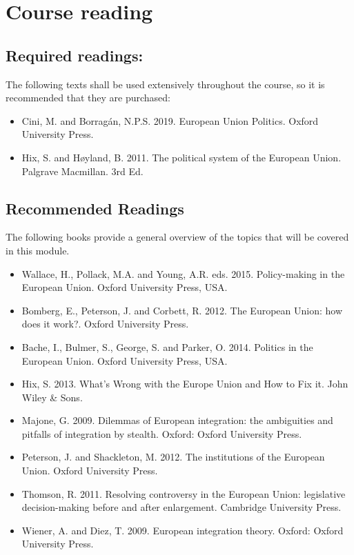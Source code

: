 
\section*{Course reading}

\subsection*{Required readings:}

The following texts shall be used extensively throughout the course, so it is recommended that they are purchased:

\begin{itemize}
	\item Cini, M. and Borragán, N.P.S. 2019. European Union Politics. Oxford University Press.
	\item Hix, S. and H\o yland, B. 2011. The political system of the European Union. Palgrave Macmillan. 3rd Ed.
\end{itemize}

\subsection*{Recommended Readings}

The following books provide a general overview of the topics that will be covered in this module. 

\begin{itemize}
	\item Wallace, H., Pollack, M.A. and Young, A.R. eds. 2015. Policy-making in the European Union. Oxford University Press, USA.
	\item Bomberg, E., Peterson, J. and Corbett, R. 2012. The European Union: how does it work?. Oxford University Press.
	\item Bache, I., Bulmer, S., George, S. and Parker, O. 2014. Politics in the European Union. Oxford University Press, USA.
	\item Hix, S. 2013. What's Wrong with the Europe Union and How to Fix it. John Wiley \& Sons.
	\item Majone, G. 2009. Dilemmas of European integration: the ambiguities and pitfalls of integration by stealth. Oxford: Oxford University Press.
	\item Peterson, J. and Shackleton, M. 2012. The institutions of the European Union. Oxford University Press.
	\item Thomson, R. 2011. Resolving controversy in the European Union: legislative decision-making before and after enlargement. Cambridge University Press.
	\item Wiener, A. and Diez, T. 2009. European integration theory. Oxford: Oxford University Press.
\end{itemize}


